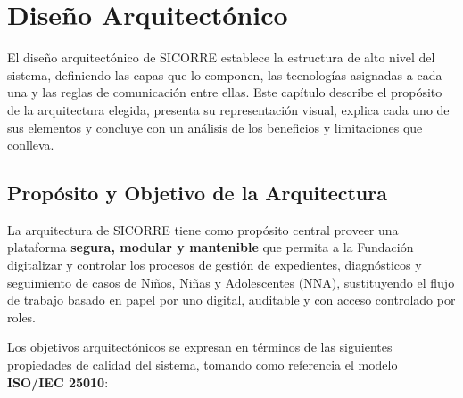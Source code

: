 %


\chapter{Diseño Arquitectónico}

El diseño arquitectónico de SICORRE establece la estructura de alto nivel del sistema,
definiendo las capas que lo componen, las tecnologías asignadas a cada una y las reglas
de comunicación entre ellas. Este capítulo describe el propósito de la arquitectura
elegida, presenta su representación visual, explica cada uno de sus elementos y concluye
con un análisis de los beneficios y limitaciones que conlleva.

\section{Propósito y Objetivo de la Arquitectura}

La arquitectura de SICORRE tiene como propósito central proveer una plataforma
\textbf{segura, modular y mantenible} que permita a la Fundación digitalizar y controlar
los procesos de gestión de expedientes, diagnósticos y seguimiento de casos de Niños,
Niñas y Adolescentes (NNA), sustituyendo el flujo de trabajo basado en papel por uno
digital, auditable y con acceso controlado por roles.

Los objetivos arquitectónicos se expresan en términos de las siguientes propiedades
de calidad del sistema, tomando como referencia el modelo \textbf{ISO/IEC 25010}:

